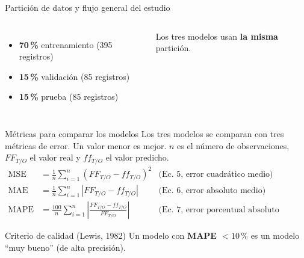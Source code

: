 \documentclass{beamer}
\begin{document}
\begin{frame}{Partición de datos y flujo general del estudio}
    \begin{columns}[c]
        \column{4.6cm}
        \small
        \begin{itemize}
            \item \textbf{70\,\%} entrenamiento (395 registros)
            \item \textbf{15\,\%} validación (85 registros)
            \item \textbf{15\,\%} prueba (85 registros)
        \end{itemize}
        \footnotesize Los tres modelos usan \textbf{la misma} partición.
        \column{6.6cm}
    \end{columns}
\end{frame}

\begin{frame}{Métricas para comparar los modelos}
    \justifying\small
    Los tres modelos se comparan con tres métricas de error. Un valor menor es mejor. $n$ es el número de observaciones, $FF_{T/O}$ el valor real y $ff_{T/O}$ el valor predicho.
    \begin{align*}
        \text{MSE} &= \frac{1}{n}\sum_{i=1}^n (FF_{T/O} - ff_{T/O})^2 & \text{(Ec.~5, error cuadrático medio)}\\
        \text{MAE} &= \frac{1}{n}\sum_{i=1}^n |FF_{T/O} - ff_{T/O}| & \text{(Ec.~6, error absoluto medio)}\\
        \text{MAPE} &= \frac{100}{n}\sum_{i=1}^n \left| \frac{FF_{T/O} - ff_{T/O}}{FF_{T/O}} \right| & \text{(Ec.~7, error porcentual absoluto medio)}
    \end{align*}
    \begin{alertblock}{Criterio de calidad (Lewis, 1982)}
        Un modelo con \textbf{MAPE $< 10\,\%$} es un modelo ``muy bueno'' (de alta precisión).
    \end{alertblock}
\end{frame}
\end{document}
